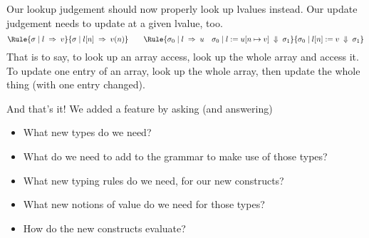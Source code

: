 \documentclass{article}
\begin{document}
Our lookup judgement should now properly look up lvalues instead.
Our update judgement needs to update at a given lvalue, too.
\[
  \Rule{\JPll{\sigma}lv}
  {\JPll{\sigma}{l[n]}{v(n)}}
  \qquad
  \Rule{\JPll{\sigma_0}lu\quad\JPla{\sigma_0}l{u[n\mapsto v]}{\sigma_1}}
       {\JPla{\sigma_0}{l[n]}v{\sigma_1}}
  \]
That is to say, to look up an array access, look up the whole array and
access it. To update one entry of an array, look up the whole array, then
update the whole thing (with one entry changed).

And that's it! We added a feature by asking (and answering)
\begin{itemize}
\item What new types do we need?
\item What do we need to add to the grammar to make use of those types?
\item What new typing rules do we need, for our new constructs?
\item What new notions of value do we need for those types?
\item How do the new constructs evaluate?
\end{itemize}
\end{document}
